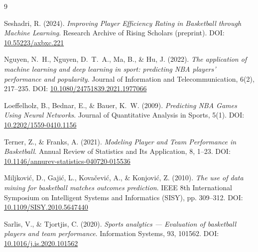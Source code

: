 \documentclass[11pt,a4paper]{article}
\begin{document}
\begin{thebibliography}{9}

Seshadri, R. (2024).
\textit{Improving Player Efficiency Rating in Basketball through Machine
Learning}.
Research Archive of Rising Scholars (preprint).
DOI: \href{https://doi.org/10.55223/axbxc.221}{10.55223/axbxc.221}

Nguyen, N.~H., Nguyen, D.~T.~A., Ma, B., \& Hu, J. (2022).
\textit{The application of machine learning and deep learning in sport:
predicting NBA players' performance and popularity}.
Journal of Information and Telecommunication, 6(2), 217--235.
DOI: \href{https://doi.org/10.1080/24751839.2021.1977066}{10.1080/24751839.2021.1977066}

Loeffelholz, B., Bednar, E., \& Bauer, K.~W. (2009).
\textit{Predicting NBA Games Using Neural Networks}.
Journal of Quantitative Analysis in Sports, 5(1).
DOI: \href{https://doi.org/10.2202/1559-0410.1156}{10.2202/1559-0410.1156}

Terner, Z., \& Franks, A. (2021).
\textit{Modeling Player and Team Performance in Basketball}.
Annual Review of Statistics and Its Application, 8, 1--23.
DOI: \href{https://doi.org/10.1146/annurev-statistics-040720-015536}{10.1146/annurev-statistics-040720-015536}

Miljković, D., Gajić, L., Kovačević, A., \& Konjović, Z. (2010).
\textit{The use of data mining for basketball matches outcomes prediction}.
IEEE 8th International Symposium on Intelligent Systems and Informatics
(SISY), pp. 309--312.
DOI: \href{https://doi.org/10.1109/SISY.2010.5647440}{10.1109/SISY.2010.5647440}

Sarlis, V., \& Tjortjis, C. (2020).
\textit{Sports analytics --- Evaluation of basketball players and team
performance}.
Information Systems, 93, 101562.
DOI: \href{https://doi.org/10.1016/j.is.2020.101562}{10.1016/j.is.2020.101562}

\end{thebibliography}
\end{document}
